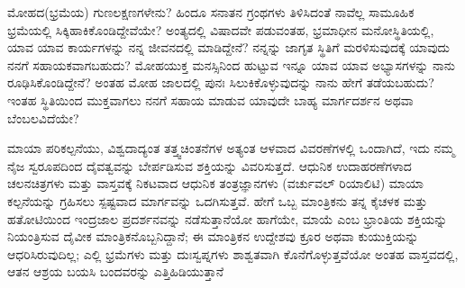 
\newpage
\begin{mananam}{}
\nfntmtxt ಮೋಹದ(ಭ್ರಮೆಯ) ಗುಣಲಕ್ಷಣಗಳೇನು? ಹಿಂದೂ ಸನಾತನ ಗ್ರಂಥಗಳು   ತಿಳಿಸಿದಂತೆ ನಾವೆಲ್ಲ ಸಾಮೂಹಿಕ ಭ್ರಮೆಯಲ್ಲಿ  ಸಿಕ್ಕಿಹಾಕಿಕೊಂಡಿದ್ದೇವೆಯೇ? ಅಂತ್ಯದಲ್ಲಿ ವಿಷಾದವೇ ಪಡುವಂತಹ, ಭ್ರಮಾಧೀನ ಮನೋಸ್ಥಿತಿಯಲ್ಲಿ, ಯಾವ ಯಾವ ಕಾರ್ಯಗಳನ್ನು ನನ್ನ ಜೀವನದಲ್ಲಿ ಮಾಡಿದ್ದೇನೆ? ನನ್ನನ್ನು ಜಾಗೃತ ಸ್ಥಿತಿಗೆ ಮರಳಿಸುವುದಕ್ಕೆ ಯಾವುದು ನನಗೆ ಸಹಾಯಕವಾಗಬಹುದು? ಮೋಹಯುಕ್ತ ಮನಸ್ಸಿನಿಂದ ಹುಟ್ಟುವ  ಇನ್ನೂ ಯಾವ ಯಾವ ಅಭ್ಯಾಸಗಳನ್ನು ನಾನು ರೂಢಿಸಿಕೊಂಡಿದ್ದೇನೆ? ಅಂತಹ ಮೋಹ ಜಾಲದಲ್ಲಿ ಪುನಃ ಸಿಲುಕಿಕೊಳ್ಳುವುದನ್ನು  ನಾನು ಹೇಗೆ ತಡೆಯಬಹುದು? ಇಂತಹ ಸ್ಥಿತಿಯಿಂದ ಮುಕ್ತವಾಗಲು ನನಗೆ ಸಹಾಯ ಮಾಡುವ ಯಾವುದೇ ಬಾಹ್ಯ ಮಾರ್ಗದರ್ಶನ ಅಥವಾ ಬೆಂಬಲವಿದೆಯೇ? 
\end{mananam}
\sReflect
\begin{inspiration}{}
\nfntmtxt ಮಾಯಾ ಪರಿಕಲ್ಪನೆಯು, ವಿಶ್ವದಾದ್ಯಂತ ತತ್ತ್ವಚಿಂತನೆಗಳ ಅತ್ಯಂತ ಆಳವಾದ ವಿವರಣೆಗಳಲ್ಲಿ ಒಂದಾಗಿದೆ, ಇದು ನಮ್ಮ ನೈಜ ಸ್ವರೂಪದಿಂದ  ದೈವತ್ವವನ್ನು ಬೇರ್ಪಡಿಸುವ   ಶಕ್ತಿಯನ್ನು ವಿವರಿಸುತ್ತದೆ. ಆಧುನಿಕ ಉದಾಹರಣೆಗಳಾದ ಚಲನಚಿತ್ರಗಳು ಮತ್ತು ವಾಸ್ತವಕ್ಕೆ ನಿಕಟವಾದ ಆಧುನಿಕ ತಂತ್ರಜ್ಞಾನಗಳು  (ವರ್ಚುವಲ್ ರಿಯಾಲಿಟಿ)  ಮಾಯಾ ಕಲ್ಪನೆಯನ್ನು ಗ್ರಹಿಸಲು ಸ್ಪಷ್ಟವಾದ ಮಾರ್ಗವನ್ನು ಒದಗಿಸುತ್ತವೆ. ಹೇಗೆ ಒಬ್ಬ ಮಾಂತ್ರಿಕನು ತನ್ನ ಕೈಚಳಕ ಮತ್ತು ಹತೋಟಿಯಿಂದ ಇಂದ್ರಜಾಲ ಪ್ರದರ್ಶನವನ್ನು ನಡೆಸುತ್ತಾನೆಯೋ ಹಾಗೆಯೇ, ಮಾಯೆ ಎಂಬ ಭ್ರಾಂತಿಯ ಶಕ್ತಿಯನ್ನು ನಿಯಂತ್ರಿಸುವ ದೈವೀಕ ಮಾಂತ್ರಿಕನೊಬ್ಬನಿದ್ದಾನೆ; ಈ ಮಾಂತ್ರಿಕನ ಉದ್ದೇಶವು ಕ್ರೂರ ಅಥವಾ ಕುಯುಕ್ತಿಯನ್ನು ಆಧರಿಸಿರುವುದಿಲ್ಲ; ಎಲ್ಲಿ ಭ್ರಮೆಗಳು ಮತ್ತು ದುಃಸ್ವಪ್ನಗಳು ಶಾಶ್ವತವಾಗಿ ಕೊನೆಗೊಳ್ಳುತ್ತವೆಯೋ ಅಂತಹ ವಾಸ್ತವದಲ್ಲಿ, ಆತನ ಆಶ್ರಯ ಬಯಸಿ ಬಂದವರನ್ನು ಎತ್ತಿಹಿಡಿಯುತ್ತಾನೆ
\end{inspiration}
\newpage

